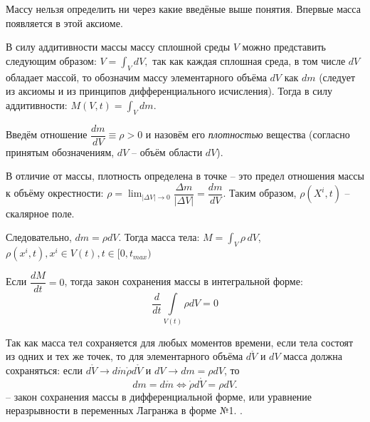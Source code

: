 Массу нельзя определить ни через какие введёные выше понятия. Впервые масса появляется
в этой аксиоме.


\begin{corollary}
  В силу аддитивности массы массу сплошной среды $V$ можно представить следующим образом:
  $V = \int_V dV,$ так как каждая сплошная среда, в том числе $dV$ обладает
  массой, то обозначим массу элементарного объёма $dV$ как $dm$ (следует из аксиомы и из
  принципов дифференциального исчисления). Тогда в силу аддитивности:
  $M(V, t) = \int_V dm$.
\end{corollary}

\begin{definition}

  Введём отношение $ \dfrac{dm}{dV} \equiv \rho > 0$ и назовём его \emph{плотностью}
  вещества (согласно принятым обозначениям, $dV$ -- объём области $dV$).

  В отличие от массы, плотность определена в точке -- это предел отношения
  массы к объёму окрестности: $\rho = \lim_{|\Delta V| \to 0} \dfrac{\Delta m}{|\Delta V|} = \dfrac{dm}{dV}$.
  Таким образом, $\rho(X^i, t)$ -- скалярное поле.
\end{definition}

\begin{corollary}
  Следовательно, $dm = \rho dV$. Тогда масса тела: $M = \int_V \rho \, dV$, $\rho(x^i, t), x^i \in V(t), t\in[0, t_{max})$
\end{corollary}

Если $ \dfrac{dM}{dt} = 0 $, тогда закон сохранения массы в интегральной форме:
\[
  \dfrac{d}{dt} \int\limits_{V(t)} \rho dV = 0
\]

\begin{corollary}
  Так как масса тел сохраняется для любых моментов времени, если тела состоят 
  из одних и тех же точек, то для элементарного объёма $d\mathring{V}$ и $dV$
  масса должна сохраняться: если $d\mathring{V} \to d\mathring{m} \mathring{\rho} d\mathring{V}$
  и $dV \to dm = \rho dV$, то
  \begin{equation}\label{lec_6:eq_lagrange_1form}
    dm = d\mathring{m} \Leftrightarrow
    \mathring{\rho} d\mathring{V} = \rho dV.
  \end{equation}
  -- закон сохранения массы в дифференциальной форме, или уравнение неразрывности в 
  переменных Лагранжа в форме №1.
  .
\end{corollary}



